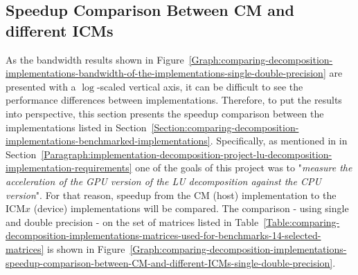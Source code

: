 \subsection{Speedup Comparison Between CM and different ICMs \TO}\label{Subsection:comparing-decomposition-implementations-speedup-comparison-between-CM-and-different-ICMs}
As the bandwidth results shown in Figure~\ref{Graph:comparing-decomposition-implementations-bandwidth-of-the-implementations-single-double-precision} are presented with a $ \log $-scaled vertical axis, it can be difficult to see the performance differences between implementations. Therefore, to put the results into perspective, this section presents the speedup comparison between the implementations listed in Section~\ref{Section:comparing-decomposition-implementations-benchmarked-implementations}. Specifically, as mentioned in \textit{} in Section~\ref{Paragraph:implementation-decomposition-project-lu-decomposition-implementation-requirements} one of the goals of this project was to "\textit{measure the acceleration of the GPU version of the LU decomposition against the CPU version}". For that reason, speedup from the CM (host) implementation to the ICM$ x $ (device) implementations will be compared. The comparison - using single and double precision - on the set of matrices listed in Table~\ref{Table:comparing-decomposition-implementations-matrices-used-for-benchmarks-14-selected-matrices} is shown in Figure~\ref{Graph:comparing-decomposition-implementations-speedup-comparison-between-CM-and-different-ICMs-single-double-precision}.

